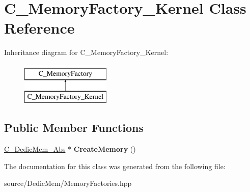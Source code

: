 \hypertarget{class_c___memory_factory___kernel}{\section{C\-\_\-\-Memory\-Factory\-\_\-\-Kernel Class Reference}
\label{class_c___memory_factory___kernel}
}
Inheritance diagram for C\-\_\-\-Memory\-Factory\-\_\-\-Kernel\-:\begin{figure}[H]
\begin{center}
\leavevmode
\includegraphics[height=2.000000cm]{class_c___memory_factory___kernel}
\end{center}
\end{figure}
\subsection*{Public Member Functions}
\begin{DoxyCompactItemize}
\item 
\hypertarget{class_c___memory_factory___kernel_ac8741e6e30ed5dad51579507cf7b4007}{\hyperlink{class_c___dedic_mem___abs}{C\-\_\-\-Dedic\-Mem\-\_\-\-Abs} $\ast$ {\bfseries Create\-Memory} ()}\label{class_c___memory_factory___kernel_ac8741e6e30ed5dad51579507cf7b4007}

\end{DoxyCompactItemize}


The documentation for this class was generated from the following file\-:\begin{DoxyCompactItemize}
\item 
source/\-Dedic\-Mem/Memory\-Factories.\-hpp\end{DoxyCompactItemize}
